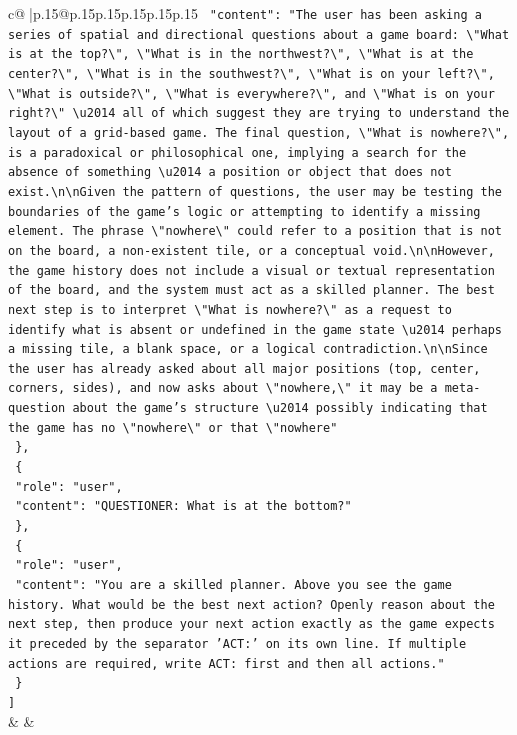 \documentclass{article}
\begin{document}
{\begin{supertabular}{c@{$\;$}|p{.15\linewidth}@{}p{.15\linewidth}p{.15\linewidth}p{.15\linewidth}p{.15\linewidth}p{.15\linewidth}}
{{{\texttt{    "content": "The user has been asking a series of spatial and directional questions about a game board: \textbackslash{}"What is at the top?\textbackslash{}", \textbackslash{}"What is in the northwest?\textbackslash{}", \textbackslash{}"What is at the center?\textbackslash{}", \textbackslash{}"What is in the southwest?\textbackslash{}", \textbackslash{}"What is on your left?\textbackslash{}", \textbackslash{}"What is outside?\textbackslash{}", \textbackslash{}"What is everywhere?\textbackslash{}", and \textbackslash{}"What is on your right?\textbackslash{}" \textbackslash{}u2014 all of which suggest they are trying to understand the layout of a grid{-}based game. The final question, \textbackslash{}"What is nowhere?\textbackslash{}", is a paradoxical or philosophical one, implying a search for the absence of something \textbackslash{}u2014 a position or object that does not exist.\textbackslash{}n\textbackslash{}nGiven the pattern of questions, the user may be testing the boundaries of the game's logic or attempting to identify a missing element. The phrase \textbackslash{}"nowhere\textbackslash{}" could refer to a position that is not on the board, a non{-}existent tile, or a conceptual void.\textbackslash{}n\textbackslash{}nHowever, the game history does not include a visual or textual representation of the board, and the system must act as a skilled planner. The best next step is to interpret \textbackslash{}"What is nowhere?\textbackslash{}" as a request to identify what is absent or undefined in the game state \textbackslash{}u2014 perhaps a missing tile, a blank space, or a logical contradiction.\textbackslash{}n\textbackslash{}nSince the user has already asked about all major positions (top, center, corners, sides), and now asks about \textbackslash{}"nowhere,\textbackslash{}" it may be a meta{-}question about the game's structure \textbackslash{}u2014 possibly indicating that the game has no \textbackslash{}"nowhere\textbackslash{}" or that \textbackslash{}"nowhere"} \\
\texttt{  \},} \\
\texttt{  \{} \\
\texttt{    "role": "user",} \\
\texttt{    "content": "QUESTIONER: What is at the bottom?"} \\
\texttt{  \},} \\
\texttt{  \{} \\
\texttt{    "role": "user",} \\
\texttt{    "content": "You are a skilled planner. Above you see the game history. What would be the best next action? Openly reason about the next step, then produce your next action exactly as the game expects it preceded by the separator 'ACT:' on its own line. If multiple actions are required, write ACT: first and then all actions."} \\
\texttt{  \}} \\
\texttt{{]}} \\
            }
        }
    }
    & & \\ \\


\end{supertabular}}
\end{document}
